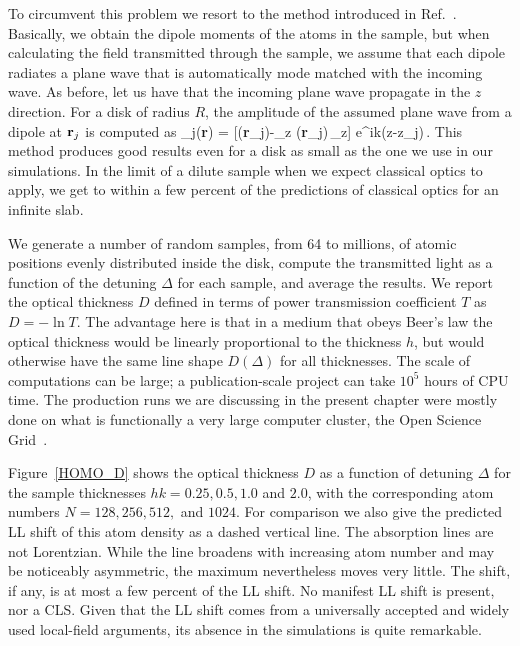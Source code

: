 To circumvent this problem we resort to the method introduced in Ref.~\cite{1367-2630-14-5-055001}. Basically, we obtain the dipole moments of the atoms in the sample, but when calculating the field transmitted through the sample, we assume that each dipole radiates a plane wave that is automatically mode matched with the incoming wave. As before, let us have that the incoming plane wave propagate in the $z$ direction. For a disk of radius $R$, the amplitude of the assumed plane wave from a dipole at ${\bf r}_j$ is computed as
\beq
\bE_j({\bf r}) =  [\bd({\bf r}_j)-_z \cdot\bd({\bf r}_j)\,_z] e^{ik(z-z_j)}\,.
\label{TRLIGHT}
\eeq
This method produces good results even for a disk as small as the one we use in our simulations. In the limit of a dilute sample when we expect classical optics to apply, we get to within a few percent of the predictions of classical optics for an infinite slab.

We generate a number of random samples, from 64 to millions, of atomic positions evenly distributed inside the disk, compute the transmitted light as a function of the detuning $\Delta$ for each sample, and average the results. We report the optical thickness $D$ defined in terms of power transmission coefficient $T$ as $D=-\ln T$. The advantage here is that in a medium that obeys Beer's law the optical thickness would be linearly proportional to the thickness $h$, but would otherwise have the same line shape $D(\Delta)$ for all thicknesses. The scale of computations can be large; a publication-scale project can take $10^5$ hours of CPU time. The production runs we are discussing in the present chapter were mostly done on what is functionally a very large computer cluster, the Open Science Grid~\cite{OSG}.

Figure~\ref{HOMO_D} shows the optical thickness $D$ as a function of detuning $\Delta$ for the sample thicknesses $hk=0.25, 0.5, 1.0$ and $2.0$, with the corresponding atom numbers $N=128, 256, 512,$ and $1024$. For comparison we also give the predicted LL shift of this atom density as a dashed vertical line. The absorption lines are not Lorentzian. While the line broadens with increasing atom number and may be noticeably asymmetric, the maximum nevertheless moves very little. The shift, if any, is at most a few percent of the LL shift. No manifest LL shift is present, nor a CLS. Given that the LL shift comes from a universally accepted and widely used local-field arguments, its absence in the simulations is quite remarkable.


